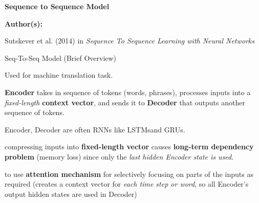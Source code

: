 


\begin{frame}{}
    \begin{center}
        \large \textbf{Sequence to Sequence Model}
    \end{center}
    \vspace{20pt}
    
    \textbf{Author(s):}
    \begin{itemizeSpaced}{5pt}
    {\color{DimGrey} 
        \item Sutskever et al. (2014) in \emph{Sequence To Sequence Learning with Neural Networks}
        
    }
    \end{itemizeSpaced}
\end{frame}





\begin{frame}{Seq-To-Seq Model (Brief Overview)}
    
    \begin{itemizeSpaced}{7pt}
        \pinkbox Used for machine translation task. 
        
        \item \textbf{Encoder} takes in sequence of tokens (words, phrases), processes inputs into a \emph{fixed-length} \textbf{context vector}, and sends it to \textbf{Decoder} that outputs another sequence of tokens. 
        
        \item Encoder, Decoder are often RNNs \footnotemark like LSTMs\footnotemark and GRUs. \footnotemark 
        
         compressing inputs into \textbf{fixed-length vector} causes \textbf{long-term dependency problem} (memory loss) since only the \emph{last hidden Encoder state is used}. 
        
        to use \textbf{attention mechanism} for selectively focusing on parts of the inputs as required (creates a context vector for \emph{each time step or word}, so all Encoder's output hidden states are used in Decoder)
        
        
    \end{itemizeSpaced} 
    
    
    
    
\end{frame}